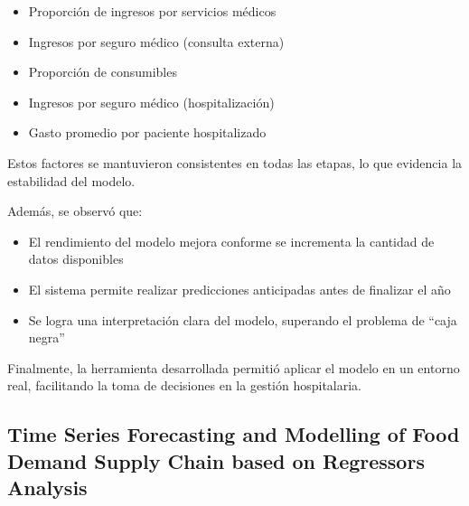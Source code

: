 \begin{itemize}
    \item Proporción de ingresos por servicios médicos
    \item Ingresos por seguro médico (consulta externa)
    \item Proporción de consumibles
    \item Ingresos por seguro médico (hospitalización)
    \item Gasto promedio por paciente hospitalizado
\end{itemize}



Estos factores se mantuvieron consistentes en todas las etapas, lo que evidencia la estabilidad del modelo.

Además, se observó que:

\begin{itemize}
    \item El rendimiento del modelo mejora conforme se incrementa la cantidad de datos disponibles
    \item El sistema permite realizar predicciones anticipadas antes de finalizar el año
    \item Se logra una interpretación clara del modelo, superando el problema de ``caja negra''
\end{itemize}

Finalmente, la herramienta desarrollada permitió aplicar el modelo en un entorno real, facilitando la toma de decisiones en la gestión hospitalaria.



\subsection{Time Series Forecasting and Modelling of Food Demand Supply Chain based on Regressors Analysis}

